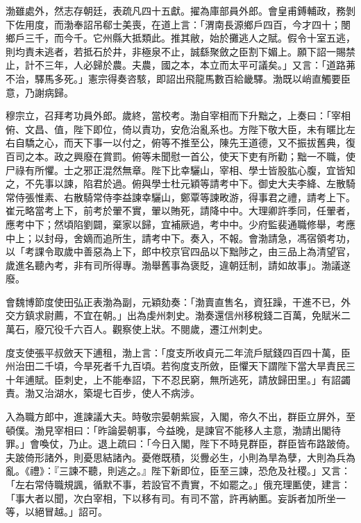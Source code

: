 \begin{pinyinscope}
 渤雖處外，然志存朝廷，表疏凡四十五獻。擢為庫部員外郎。會皇甫鎛輔政，務剝下佐用度，而渤奉詔吊郗士美喪，在道上言：「渭南長源鄉戶四百，今才四十；閿鄉戶三千，而今千。它州縣大抵類此。推其敝，始於攤逃人之賦。假令十室五逃，則均責未逃者，若抵石於井，非極泉不止，誠繇聚斂之臣割下媚上。願下詔一賜禁止，計不三年，人必歸於農。夫農，國之本，本立而太平可議矣。」又言：「道路茀不治，驛馬多死。」憲宗得奏咨駭，即詔出飛龍馬數百給畿驛。渤既以峭直觸要臣意，乃謝病歸。



 穆宗立，召拜考功員外郎。歲終，當校考。渤自宰相而下升黜之，上奏曰：「宰相俯、文昌、值，陛下即位，倚以責功，安危治亂系也。方陛下敬大臣，未有暱比左右自驕之心，而天下事一以付之，俯等不推至公，陳先王道德，又不振拔舊典，復百司之本。政之興廢在賞罰。俯等未聞慰一首公，使天下吏有所勸；黜一不職，使尸祿有所懼。士之邪正混然無章。陛下比幸驪山，宰相、學士皆股肱心腹，宜皆知之，不先事以諫，陷君於過。俯與學士杜元穎等請考中下。御史大夫李絳、左散騎常侍張惟素、右散騎常侍李益諫幸驪山，鄭覃等諫畋游，得事君之禮，請考上下。崔元略當考上下，前考於翬不實，翬以賄死，請降中中。大理卿許季同，任翬者，應考中下；然頃陷劉闢，棄家以歸，宜補厥過，考中中。少府監裴通職修舉，考應中上；以封母，舍嫡而追所生，請考中下。奏入，不報。會渤請急，馮宿領考功，以「考課令取歲中善惡為上下，郎中校京官四品以下黜陟之，由三品上為清望官，歲進名聽內考，非有司所得專。渤舉舊事為褒貶，違朝廷制，請如故事」。渤議遂廢。



 會魏博節度使田弘正表渤為副，元穎劾奏：「渤賣直售名，資狂躁，干進不已，外交方鎮求尉薦，不宜在朝。」出為虔州刺史。渤奏還信州移稅錢二百萬，免賦米二萬石，廢冗役千六百人。觀察使上狀。不閱歲，遷江州刺史。



 度支使張平叔斂天下逋租，渤上言：「度支所收貞元二年流戶賦錢四百四十萬，臣州治田二千頃，今旱死者千九百頃。若徇度支所斂，臣懼天下謂陛下當大旱責民三十年逋賦。臣刺史，上不能奉詔，下不忍民窮，無所逃死，請放歸田里。」有詔蠲責。渤又治湖水，築堤七百步，使人不病涉。



 入為職方郎中，進諫議大夫。時敬宗晏朝紫宸，入閣，帝久不出，群臣立屏外，至頓僕。渤見宰相曰：「昨論晏朝事，今益晚，是諫官不能移人主意，渤請出閣待罪。」會喚仗，乃止。退上疏曰：「今日入閣，陛下不時見群臣，群臣皆布路跛倚。夫跛倚形諸外，則憂思結諸內。憂倦既積，災釁必生，小則為旱為孽，大則為兵為亂。《禮》：『三諫不聽，則逃之。』陛下新即位，臣至三諫，恐危及社稷。」又言：「左右常侍職規諷，循默不事，若設官不責實，不如罷之。」俄充理匭使，建言：「事大者以聞，次白宰相，下以移有司。有司不當，許再納匭。妄訴者加所坐一等，以絕冒越。」詔可。




\end{pinyinscope}
